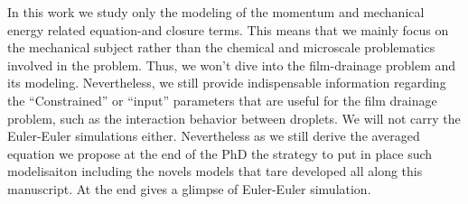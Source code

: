 In this work we study only the modeling of the momentum and mechanical energy related equation-and closure terms. 
This means that we mainly focus on the mechanical subject rather than the chemical and microscale problematics involved in the problem. 
Thus, we won't dive into the film-drainage problem and its modeling.   
Nevertheless, we still provide indispensable information regarding the ``Constrained'' or ``input'' parameters that are useful for the film drainage problem, such as the interaction behavior between droplets. 
We will not carry the Euler-Euler simulations either.
Nevertheless as we still derive the averaged equation we propose at the end of the PhD the strategy to put in place such modelisaiton including the novels models that tare developed all along this manuscript. 
At the end gives a glimpse of Euler-Euler simulation. 


